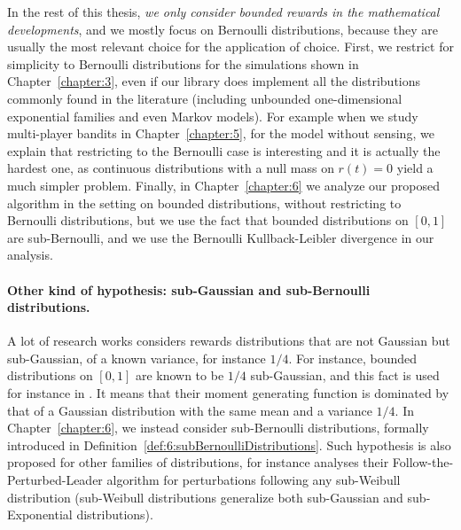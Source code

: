 In the rest of this thesis, \emph{we only consider bounded rewards in the mathematical developments}, and we mostly focus on Bernoulli distributions, because they are usually the most relevant choice for the application of choice.
First, we restrict for simplicity to Bernoulli distributions for the simulations shown in Chapter~\ref{chapter:3}, even if our library does implement all the distributions commonly found in the literature (including unbounded one-dimensional exponential families and even Markov models).
%
For example when we study multi-player bandits in Chapter~\ref{chapter:5}, for the model without sensing, we explain that restricting to the Bernoulli case is interesting and it is actually the hardest one, as continuous distributions with a null mass on $r(t)=0$ yield a much simpler problem.
%
Finally, in Chapter~\ref{chapter:6} we analyze our proposed algorithm in the setting on bounded distributions, without restricting to Bernoulli distributions, but we use the fact that bounded distributions on $[0,1]$ are sub-Bernoulli, and we use the Bernoulli Kullback-Leibler divergence in our analysis.


\paragraph{Other kind of hypothesis: sub-Gaussian and sub-Bernoulli distributions.}
%
A lot of research works considers rewards distributions that are not Gaussian but sub-Gaussian, of a known variance, for instance $1/4$.
For instance, bounded distributions on $[0,1]$ are known to be $1/4$ sub-Gaussian, and this fact is used for instance in \cite{Maillard2018GLR}.
It means that their moment generating function is dominated by that of a Gaussian distribution with the same mean and a variance $1/4$.
In Chapter~\ref{chapter:6}, we instead consider sub-Bernoulli distributions, formally introduced in Definition~\ref{def:6:subBernoulliDistributions}.
%
Such hypothesis is also proposed for other families of distributions, for instance \cite{KimTewari2019} analyses their Follow-the-Perturbed-Leader algorithm for perturbations following any sub-Weibull distribution (sub-Weibull distributions generalize both sub-Gaussian and sub-Exponential distributions).



